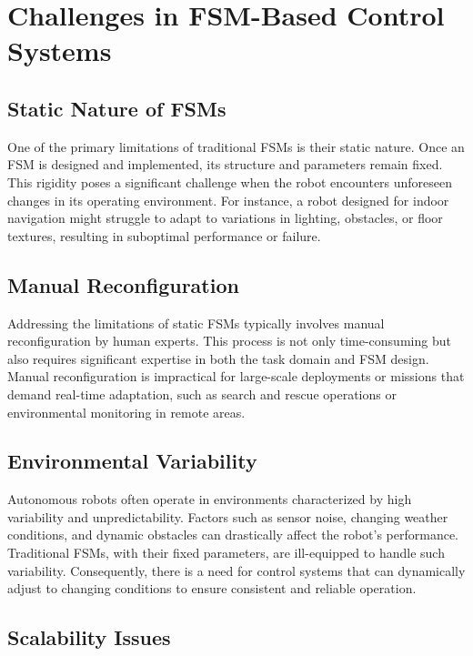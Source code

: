 \documentclass{ULBreport}
\begin{document}
\section{Challenges in FSM-Based Control Systems}

\subsection{Static Nature of FSMs}

One of the primary limitations of traditional FSMs is their static nature. Once an FSM is designed and implemented, its structure and parameters remain fixed. This rigidity poses a significant challenge when the robot encounters unforeseen changes in its operating environment. For instance, a robot designed for indoor navigation might struggle to adapt to variations in lighting, obstacles, or floor textures, resulting in suboptimal performance or failure.

\subsection{Manual Reconfiguration}

Addressing the limitations of static FSMs typically involves manual reconfiguration by human experts. This process is not only time-consuming but also requires significant expertise in both the task domain and FSM design. Manual reconfiguration is impractical for large-scale deployments or missions that demand real-time adaptation, such as search and rescue operations or environmental monitoring in remote areas.

\subsection{Environmental Variability}

Autonomous robots often operate in environments characterized by high variability and unpredictability. Factors such as sensor noise, changing weather conditions, and dynamic obstacles can drastically affect the robot's performance. Traditional FSMs, with their fixed parameters, are ill-equipped to handle such variability. Consequently, there is a need for control systems that can dynamically adjust to changing conditions to ensure consistent and reliable operation.

\subsection{Scalability Issues}
\end{document}
